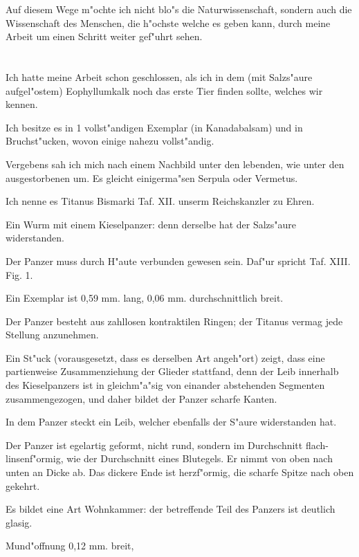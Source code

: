 \documentclass[a4paper, 11pt, oneside, german]{article}
\begin{document}
Auf diesem Wege m"ochte ich nicht blo"s die Naturwissenschaft, sondern auch die Wissenschaft des Menschen, die h"ochste welche es geben kann, durch meine Arbeit um einen Schritt weiter gef"uhrt sehen.
\clearpage
\section{}
\paragraph{}
Ich hatte meine Arbeit schon geschlossen, als ich in dem (mit Salzs"aure aufgel"ostem) Eophyllumkalk noch das erste Tier finden sollte, welches wir kennen.

Ich besitze es in 1 vollst"andigen Exemplar (in Kanadabalsam) und in Bruchst"ucken, wovon einige nahezu vollst"andig.

Vergebens sah ich mich nach einem Nachbild unter den lebenden, wie unter den ausgestorbenen um. Es gleicht einigerma"sen Serpula oder Vermetus.

Ich nenne es Titanus Bismarki Taf. XII. unserm Reichskanzler zu Ehren.

Ein Wurm mit einem Kieselpanzer: denn derselbe hat der Salzs"aure widerstanden.

Der Panzer muss durch H"aute verbunden gewesen sein. Daf"ur spricht Taf. XIII. Fig. 1.

Ein Exemplar ist 0,59 mm. lang, 0,06 mm. durchschnittlich breit.

Der Panzer besteht aus zahllosen kontraktilen Ringen; der Titanus vermag jede Stellung anzunehmen.

Ein St"uck (vorausgesetzt, dass es derselben Art angeh"ort) zeigt, dass eine partienweise Zusammenziehung der Glieder stattfand, denn der Leib innerhalb des Kieselpanzers ist in gleichm"a"sig von einander abstehenden Segmenten zusammengezogen, und daher bildet der Panzer scharfe Kanten.

In dem Panzer steckt ein Leib, welcher ebenfalls der S"aure widerstanden hat.

Der Panzer ist egelartig geformt, nicht rund, sondern im Durchschnitt flach-linsenf"ormig, wie der Durchschnitt eines Blutegels. Er nimmt von oben nach unten an Dicke ab. Das dickere Ende ist herzf"ormig, die scharfe Spitze nach oben gekehrt.

Es bildet eine Art Wohnkammer: der betreffende Teil des Panzers ist deutlich glasig.

Mund"offnung 0,12 mm. breit,
\end{document}
